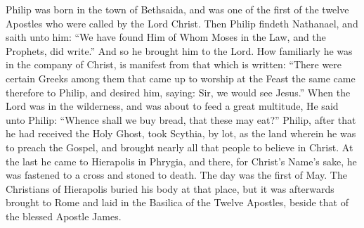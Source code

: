 Philip was born in the town of Bethsaida, and was one of the first of the twelve Apostles who were called by the Lord Christ. Then Philip findeth Nathanael, and saith unto him: “We have found Him of Whom Moses in the Law, and the Prophets, did write.” And so he brought him to the Lord. How familiarly he was in the company of Christ, is manifest from that which is written: “There were certain Greeks among them that came up to worship at the Feast the same came therefore to Philip, and desired him, saying: Sir, we would see Jesus.” When the Lord was in the wilderness, and was about to feed a great multitude, He said unto Philip: “Whence shall we buy bread, that these may eat?” Philip, after that he had received the Holy Ghost, took Scythia, by lot, as the land wherein he was to preach the Gospel, and brought nearly all that people to believe in Christ. At the last he came to Hierapolis in Phrygia, and there, for Christ’s Name’s sake, he was fastened to a cross and stoned to death. The day was the first of May. The Christians of Hierapolis buried his body at that place, but it was afterwards brought to Rome and laid in the Basilica of the Twelve Apostles, beside that of the blessed Apostle James.
